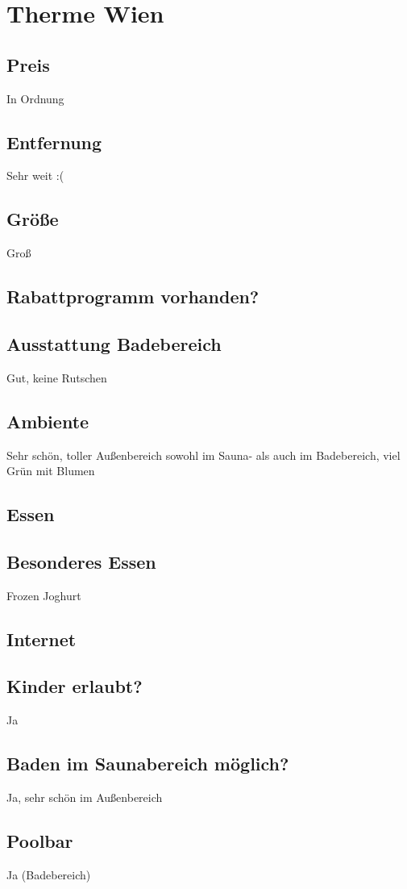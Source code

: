 \documentclass{article}
\begin{document}
\section*{Therme Wien}
\subsection*{Preis} In Ordnung
\subsection*{Entfernung} Sehr weit :(
\subsection*{Größe} Groß
\subsection*{Rabattprogramm vorhanden?}
\subsection*{Ausstattung Badebereich} Gut, keine Rutschen
\subsection*{Ambiente} Sehr schön, toller Außenbereich sowohl im Sauna- als auch im Badebereich, viel Grün mit Blumen
\subsection*{Essen}
\subsection*{Besonderes Essen} Frozen Joghurt
\subsection*{Internet}
\subsection*{Kinder erlaubt?} Ja
\subsection*{Baden im Saunabereich möglich?} Ja, sehr schön im Außenbereich
\subsection*{Poolbar} Ja (Badebereich)
\end{document}
